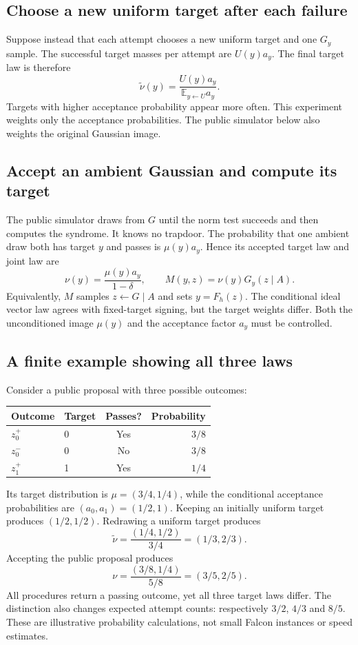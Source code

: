 \documentclass[11pt,a4paper]{article}
\newcommand{\E}{\mathbb E}
\theoremstyle{definition}
\theoremstyle{remark}
\numberwithin{equation}{section}
\begin{document}
\subsection{Choose a new uniform target after each failure}

Suppose instead that each attempt chooses a new uniform target and one
$G_y$ sample. The successful target masses per attempt are $U(y)a_y$.
The final target law is therefore
\[
 \widetilde\nu(y)=\frac{U(y)a_y}{\E_{y\leftarrow U}a_y}.
\]
Targets with higher acceptance probability appear more often. This experiment weights only the acceptance probabilities. The public
simulator below also weights the original Gaussian image.

\subsection{Accept an ambient Gaussian and compute its target}

The public simulator draws from $G$ until the norm test succeeds and then
computes the syndrome. It knows no trapdoor. The probability that one ambient
draw both has target $y$ and passes is $\mu(y)a_y$. Hence its accepted
target law and joint law are
\[
 \nu(y)=\frac{\mu(y)a_y}{1-\delta},
 \qquad
 M(y,z)=\nu(y)G_y(z\mid A).
\]
Equivalently, $M$ samples $z\leftarrow G\mid A$ and sets $y=F_h(z)$.
The conditional ideal vector law agrees with fixed-target signing, but the
target weights differ. Both the unconditioned image $\mu(y)$ and the
acceptance factor $a_y$ must be controlled.

\subsection{A finite example showing all three laws}

Consider a public proposal with three possible outcomes:
\begin{center}
\begin{tabular}{llcr}
\toprule
Outcome & Target & Passes? & Probability\\
\midrule
$z_0^+$ & 0 & Yes & $3/8$\\
$z_0^-$ & 0 & No  & $3/8$\\
$z_1^+$ & 1 & Yes & $1/4$\\
\bottomrule
\end{tabular}
\end{center}
Its target distribution is $\mu=(3/4,1/4)$, while the conditional
acceptance probabilities are $(a_0,a_1)=(1/2,1)$. Keeping an initially uniform
target produces $(1/2,1/2)$. Redrawing a uniform target produces
\[
 \widetilde\nu=\frac{(1/4,1/2)}{3/4}=(1/3,2/3).
\]
Accepting the public proposal produces
\[
 \nu=\frac{(3/8,1/4)}{5/8}=(3/5,2/5).
\]
All procedures return a passing outcome, yet all three target laws differ.
The distinction also changes expected attempt counts: respectively $3/2$,
$4/3$ and $8/5$. These are illustrative probability calculations, not small
Falcon instances or speed estimates.
\end{document}
